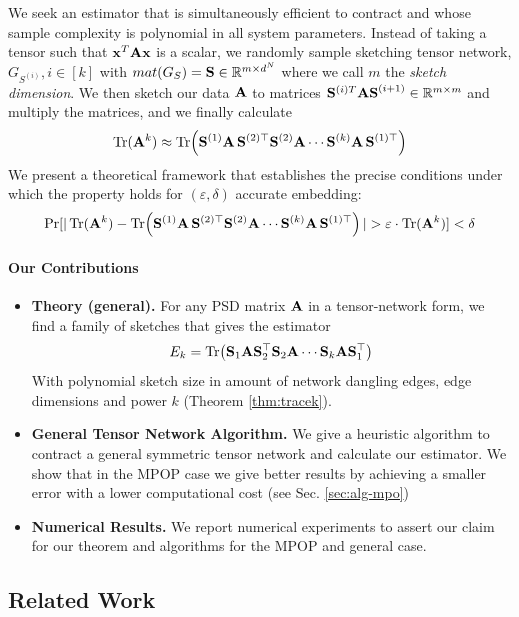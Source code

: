 \documentclass[11pt]{article}
\theoremstyle{plain}
\theoremstyle{definition}
\theoremstyle{remark}
\begin{document}
We seek an estimator that is simultaneously  efficient to contract and whose sample complexity is polynomial in all system parameters.
Instead of taking a tensor such that $\mathbf{\boldsymbol{x}}^T\mathbf{A}\mathbf{\boldsymbol{x}}$  is a scalar, we randomly sample sketching tensor network, $G_{S^{(i)}}, i\in[k]$  with $mat(G_S)=\mathbf{S}\in\mathbb{R}^{m\times d^N}$ where we call $m$  the \emph{sketch dimension}. We then sketch our data $\mathbf{A}$ to matrices $\mathbf{S}^{(i)T}\mathbf{AS}^{(i+1)}\in \mathbb{R}^{m\times m}$ and multiply the matrices, and we finally calculate $$\mathop{\mathrm{Tr}}(\mathbf{A}^k)\approx \mathop{\mathrm{Tr}}\!\left(\mathbf{S}^{(1)}\mathbf{A}\,\mathbf{S}^{(2)\top}
      \mathbf{S}^{(2)}\mathbf{A}\cdots
      \mathbf{S}^{(k)}\mathbf{A}\,\mathbf{S}^{(1)\top}\right)$$   We present a theoretical framework that establishes the precise conditions under which the property holds for $(\varepsilon,\delta)$ accurate embedding: 
      \begin{equation}
          \Pr[|\trace(\matA^k)-\trace\!\left(\matS^{(1)}\matA\,\matS^{(2)\top}
      \matS^{(2)}\matA\cdots
      \matS^{(k)}\matA\,\matS^{(1)\top}\right)|>\varepsilon\cdot\trace(\matA^k)]<\delta
      \end{equation}
\paragraph{Our Contributions}
\begin{itemize}
  \item \textbf{Theory (general).} For any PSD matrix $\mathbf{A}$ in a tensor-network form, we find a family of sketches that gives the estimator  \[
    E_{k}
      =\mathop{\mathrm{Tr}}\!\left(\mathbf{S}_{1}\mathbf{A}\mathbf{S}_{2}^{\top}
        \mathbf{S}_{2}\mathbf{A}\cdots\mathbf{S}_{k}\mathbf{A}\mathbf{S}_{1}^{\top}\right)
  \]
  With polynomial sketch size in amount of network dangling edges, edge dimensions and power $k$ (Theorem \ref{thm:tracek}).
  \item \textbf{General Tensor Network Algorithm.} We give a heuristic algorithm to contract a general symmetric tensor network and calculate our estimator. We show that in the MPOP case we give better results by achieving a smaller error with a lower computational cost (see Sec. \ref{sec:alg-mpo})
  \item  \textbf{Numerical Results.} We report numerical experiments to assert our claim for our theorem and algorithms for the MPOP and general case. 
\end{itemize}

\subsection{Related Work}
\label{sec:related}
\end{document}
